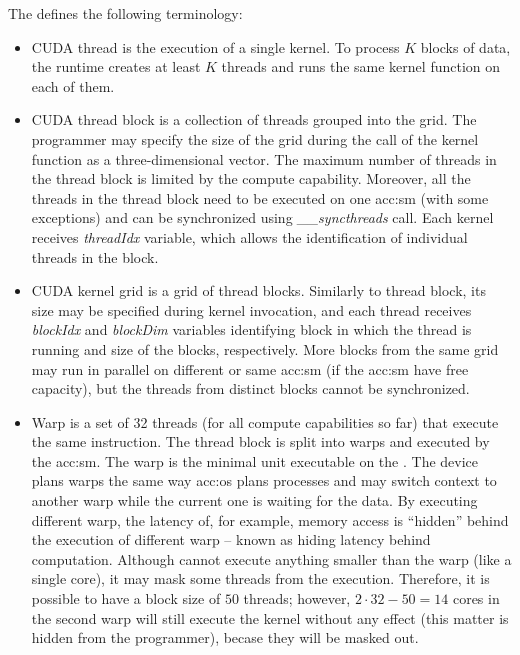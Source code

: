 The \cuda defines the following terminology:
\begin{itemize}
    \item CUDA thread is the execution of a single kernel. To process $K$ blocks of data, the runtime creates at least $K$ threads and runs the same kernel function on each of them.
    \item CUDA thread block is a collection of threads grouped into the grid. The programmer may specify the size of the grid during the call of the kernel function as a three-dimensional vector. The maximum number of threads in the thread block is limited by the compute capability. Moreover, all the threads in the thread block need to be executed on one \acrshort{acc:sm} (with some exceptions) and can be synchronized using \textit{\_\_syncthreads} call. Each kernel receives \textit{threadIdx} variable, which allows the identification of individual threads in the block.
    \item CUDA kernel grid is a grid of thread blocks. Similarly to thread block, its size may be specified during kernel invocation, and each thread receives \textit{blockIdx} and \textit{blockDim} variables identifying block in which the thread is running and size of the blocks, respectively. More blocks from the same grid may run in parallel on different or same \acrshort{acc:sm} (if the \acrshort{acc:sm} have free capacity), but the threads from distinct blocks cannot be synchronized.
    \item Warp is a set of 32 threads (for all compute capabilities so far) that execute the same instruction. The thread block is split into warps and executed by the \acrshort{acc:sm}. The warp is the minimal unit executable on the \gpu. The device plans warps the same way \acrshort{acc:os} plans processes and may switch context to another warp while the current one is waiting for the data. By executing different warp, the latency of, for example, memory access is \enquote{hidden} behind the execution of different warp -- known as hiding latency behind computation. Although \gpu cannot execute anything smaller than the warp (like a single core), it may mask some threads from the execution. Therefore, it is possible to have a block size of $50$ threads; however, $2\cdot32 - 50=14$ cores in the second warp will still execute the kernel without any effect (this matter is hidden from the programmer), becase they will be masked out.
\end{itemize}

